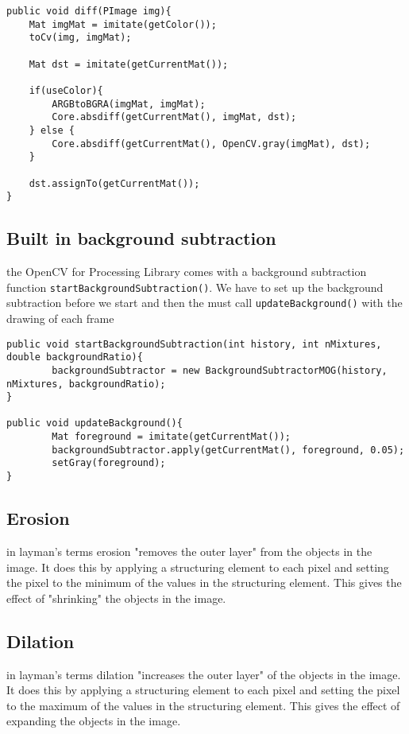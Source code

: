 \documentclass[a4paper]{report}
\begin{document}
\begin{lstlisting}
public void diff(PImage img){
	Mat imgMat = imitate(getColor());
	toCv(img, imgMat);

	Mat dst = imitate(getCurrentMat());

	if(useColor){
		ARGBtoBGRA(imgMat, imgMat);
		Core.absdiff(getCurrentMat(), imgMat, dst);
	} else {
		Core.absdiff(getCurrentMat(), OpenCV.gray(imgMat), dst);
	}
		
	dst.assignTo(getCurrentMat());
}
\end{lstlisting}

\subsection{Built in background subtraction}
the OpenCV for Processing Library comes with a background subtraction function \verb|startBackgroundSubtraction()|. We have to set up the background subtraction before we start and then the must call \verb|updateBackground()| with the drawing of each frame

\begin{lstlisting}
public void startBackgroundSubtraction(int history, int nMixtures, double backgroundRatio){
		backgroundSubtractor = new BackgroundSubtractorMOG(history, nMixtures, backgroundRatio);
}
	
public void updateBackground(){
		Mat foreground = imitate(getCurrentMat());
		backgroundSubtractor.apply(getCurrentMat(), foreground, 0.05);
		setGray(foreground);
}
\end{lstlisting}

\subsection{Erosion}
in layman's terms erosion "removes the outer layer" from the objects in the image. It does this by applying a structuring element to each pixel and setting the pixel to the minimum of the values in the structuring element. This gives the effect of "shrinking" the objects in the image.

\subsection{Dilation}
in layman's terms dilation "increases the outer layer" of the objects in the image. It does this by applying a structuring element to each pixel and setting the pixel to the maximum of the values in the structuring element. This gives the effect of expanding the objects in the image.
\end{document}
